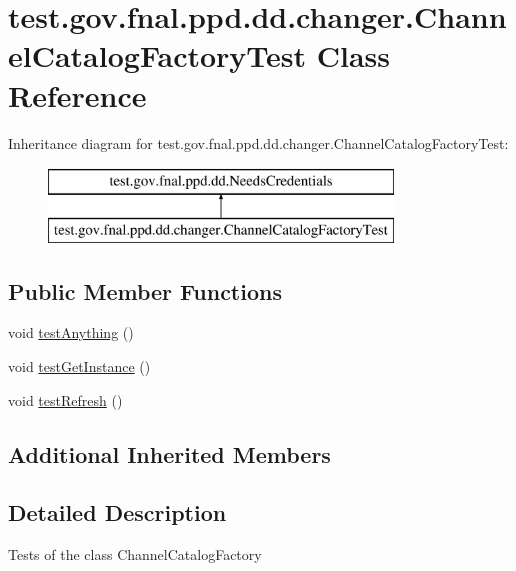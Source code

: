 \hypertarget{classtest_1_1gov_1_1fnal_1_1ppd_1_1dd_1_1changer_1_1ChannelCatalogFactoryTest}{\section{test.\-gov.\-fnal.\-ppd.\-dd.\-changer.\-Channel\-Catalog\-Factory\-Test Class Reference}
\label{classtest_1_1gov_1_1fnal_1_1ppd_1_1dd_1_1changer_1_1ChannelCatalogFactoryTest}
}
Inheritance diagram for test.\-gov.\-fnal.\-ppd.\-dd.\-changer.\-Channel\-Catalog\-Factory\-Test\-:\begin{figure}[H]
\begin{center}
\leavevmode
\includegraphics[height=2.000000cm]{classtest_1_1gov_1_1fnal_1_1ppd_1_1dd_1_1changer_1_1ChannelCatalogFactoryTest}
\end{center}
\end{figure}
\subsection*{Public Member Functions}
\begin{DoxyCompactItemize}
\item 
void \hyperlink{classtest_1_1gov_1_1fnal_1_1ppd_1_1dd_1_1changer_1_1ChannelCatalogFactoryTest_a6321222c36c1a42a451a4c622191e8ac}{test\-Anything} ()
\item 
void \hyperlink{classtest_1_1gov_1_1fnal_1_1ppd_1_1dd_1_1changer_1_1ChannelCatalogFactoryTest_a0f381506eaec142e6ffdd0c4ea09bcba}{test\-Get\-Instance} ()
\item 
void \hyperlink{classtest_1_1gov_1_1fnal_1_1ppd_1_1dd_1_1changer_1_1ChannelCatalogFactoryTest_a4874cd96233775a71b46d9ff235ffb7e}{test\-Refresh} ()
\end{DoxyCompactItemize}
\subsection*{Additional Inherited Members}


\subsection{Detailed Description}
Tests of the class Channel\-Catalog\-Factory

